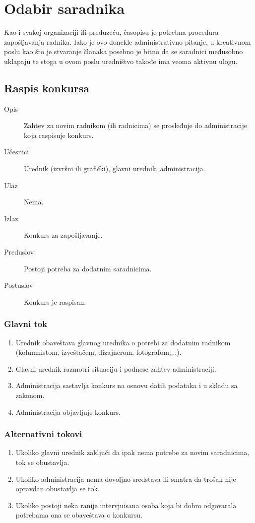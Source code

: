 \section{Odabir saradnika}
Kao i svakoj organizaciji ili preduzeću, časopisu je potrebna procedura zapošljavanja radnika. Iako je ovo donekle administrativno pitanje, u kreativnom poslu kao što je stvaranje članaka posebno je bitno da se saradnici međusobno uklapaju te stoga u ovom poslu uredništvo takođe ima veoma aktivnu ulogu.


\subsection{Raspis konkursa}
\begin{description}
\item [Opis] Zahtev za novim radnikom (ili radnicima) se prosleđuje do administracije koja raspisuje konkurs.
\item [Učesnici] Urednik (izvršni ili grafički), glavni urednik, administracija.
\item [Ulaz] Nema.
\item [Izlaz] Konkurs za zapošljavanje.
\item [Preduslov] Postoji potreba za dodatnim saradnicima.
\item [Postuslov] Konkurs je raspisan.
\end{description}
\subsubsection{Glavni tok}
\begin{enumerate} 
\item Urednik obaveštava glavnog urednika o potrebi za dodatnim radnikom (kolumnistom, izveštačem, dizajnerom, fotografom,...).
\item Glavni urednik razmotri situaciju i podnese zahtev administraciji.
\item Administracija sastavlja konkurs na osnovu datih podataka i u skladu sa zakonom.
\item Administracija objavljuje konkurs.
\end{enumerate}
\subsubsection{Alternativni tokovi}
\begin{enumerate} 
\item Ukoliko glavni urednik zaključi da ipak nema potrebe za novim saradnicima, tok se obustavlja.
\item Ukoliko administracija nema dovoljno sredstava ili smatra da trošak nije opravdan obustavlja se tok.
\item Ukoliko postoji neka ranije intervjuisana osoba koja bi dobro odgovarala potrebama ona se obaveštava o konkursu.
\end{enumerate}

